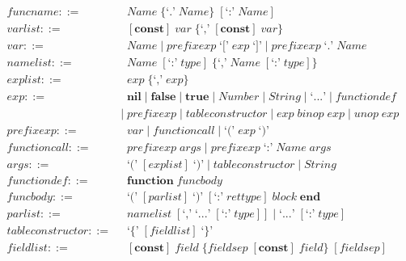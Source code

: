 \begin{align*}
\textit{funcname} ::= & \;\; \textit{Name} \; \{\texttt{`.'} \; \textit{Name}\} \; [\texttt{`:'} \; \textit{Name}]\\
\textit{varlist} ::= & \;\; [\textbf{const}] \; \textit{var} \;
  \{\texttt{`,'} \; [\textbf{const}] \; \textit{var}\}\\
\textit{var} ::= & \;\; \textit{Name} \; | \;
  \textit{prefixexp} \; \texttt{`['} \; \textit{exp} \; \texttt{`]'} \; | \;
  \textit{prefixexp} \; \texttt{`.'} \; \textit{Name}\\
\textit{namelist} ::= & \;\; \textit{Name} \; [\texttt{`:'} \; \textit{type}] \;
  \{\texttt{`,'} \; \textit{Name} \; [\texttt{`:'} \; \textit{type}]\}\\
\textit{explist} ::= & \;\; \textit{exp} \; \{\texttt{`,'} \; \textit{exp}\}\\
\textit{exp} ::= & \;\; \textbf{nil} \; | \;
  \textbf{false} \; | \;
  \textbf{true} \; | \;
  \textit{Number} \; | \;
  \textit{String} \; | \;
  \texttt{`...'} \; | \;
  \textit{functiondef}\\
& | \; \textit{prefixexp} \; | \;
  \textit{tableconstructor} \; | \;
  \textit{exp} \; \textit{binop} \; \textit{exp} \; | \;
  \textit{unop} \; \textit{exp}\\
\textit{prefixexp} ::= & \;\; \textit{var} \; | \;
  \textit{functioncall} \; | \;
  \texttt{`('} \; \textit{exp} \; \texttt{`)'}\\
\textit{functioncall} ::= & \;\; \textit{prefixexp} \; \textit{args} \; | \;
  \textit{prefixexp} \; \texttt{`:'} \; \textit{Name} \; \textit{args}\\
\textit{args} ::= & \;\; \texttt{`('} \; [\textit{explist}] \; \texttt{`)'} \; | \;
  \textit{tableconstructor} \; | \;
  \textit{String}\\
\textit{functiondef} ::= & \;\; \textbf{function} \; \textit{funcbody}\\
\textit{funcbody} ::= & \;\; \texttt{`('} \; [\textit{parlist}] \; \texttt{`)'} \;
  [\texttt{`:'} \; \textit{rettype}] \; \textit{block} \; \textbf{end}\\
\textit{parlist} ::= & \;\; \textit{namelist} \; [\texttt{`,'} \; \texttt{`...'} \;
  [\texttt{`:'} \; \textit{type}]] \; | \;
  \texttt{`...'} \; [\texttt{`:'} \; \textit{type}]\\
\textit{tableconstructor} ::= & \;\; \texttt{`\{'} \; [\textit{fieldlist}] \; \texttt{`\}'}\\
\textit{fieldlist} ::= & \;\; [\textbf{const}] \; \textit{field} \;
  \{\textit{fieldsep} \; [\textbf{const}] \; \textit{field}\} \; [\textit{fieldsep}]\\

\end{align*}
